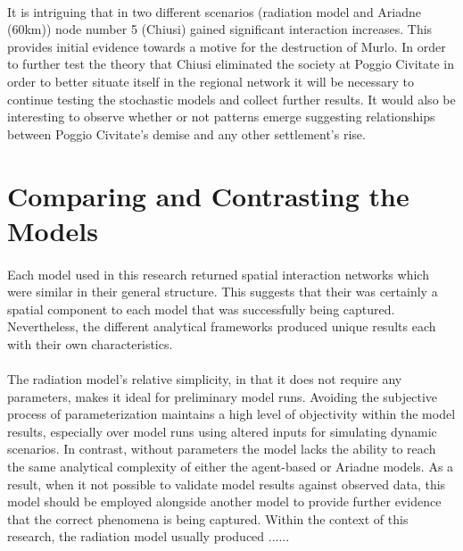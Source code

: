 \documentclass[12pt,a4paper]{thesis}
\begin{document}
\paragraph{}
It is intriguing that in two different scenarios (radiation model and Ariadne (60km)) node number 5 (Chiusi) gained significant interaction increases. This provides initial evidence towards a motive for the destruction of Murlo. In order to further test the theory that Chiusi eliminated the society at Poggio Civitate in order to better situate itself in the regional network it will be necessary to continue testing the stochastic models and collect further results. It would also be interesting to observe whether or not patterns emerge suggesting relationships between Poggio Civitate's demise and any other settlement's rise.
  

\section{Comparing and Contrasting the Models}
\paragraph{}
Each model used in this research returned spatial interaction networks which were similar in their general structure. This suggests that their was certainly a spatial component to each model that was successfully being captured. Nevertheless, the different analytical frameworks produced unique results each with their own characteristics.

\paragraph{}
The radiation model's relative simplicity, in that it does not require any parameters, makes it ideal for preliminary model runs. Avoiding the subjective process of parameterization maintains a high level of objectivity within the model results, especially over model runs using altered inputs for simulating dynamic scenarios. In contrast, without parameters the model lacks the ability to reach the same analytical complexity of either the agent-based or Ariadne models. As a result, when it not possible to validate model results against observed data, this model should be employed alongside another model to provide further evidence that the correct phenomena is being captured. Within the context of this research, the radiation model usually produced ......

  
\end{document}

